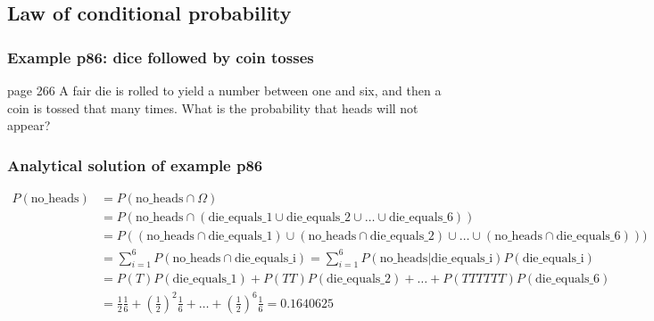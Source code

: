 \subsection{Law of conditional probability}

\begin{frame}
    \frametitle{Example p86: dice followed by coin tosses}

    \begin{manualProbExample}{page 266}
        A fair die is rolled to yield a number between one and six, and then a
        coin is tossed that many times. What is the probability that heads will
        not appear?
    \end{manualProbExample}

\end{frame}

\begin{frame}
    \frametitle{Analytical solution of example p86}
    \tiny
    \begin{align*}
        P(\text{no\_heads})&=P(\text{no\_heads}\cap\Omega)\\
                           &=P(\text{no\_heads}\cap\left(\text{die\_equals\_1}\cup\text{die\_equals\_2}\cup\dots\cup\text{die\_equals\_6}\right))\\
                           &=P((\text{no\_heads}\cap\text{die\_equals\_1})\cup (\text{no\_heads}\cap\text{die\_equals\_2})\cup\ldots\cup (\text{no\_heads}\cap\text{die\_equals\_6})))\\
                           &=\sum_{i=1}^6P(\text{no\_heads}\cap\text{die\_equals\_i})=\sum_{i=1}^6P(\text{no\_heads}|\text{die\_equals\_i})P(\text{die\_equals\_i})\\
                           &=P(T)P(\text{die\_equals\_1})+
                           P(TT)P(\text{die\_equals\_2})+\ldots +
                           P(TTTTTT)P(\text{die\_equals\_6})\\
                           &=\frac{1}{2}\frac{1}{6}+\left(\frac{1}{2}\right)^2\frac{1}{6}+\ldots+\left(\frac{1}{2}\right)^6\frac{1}{6}=0.1640625
    \end{align*}
    \normalsize

\end{frame}

